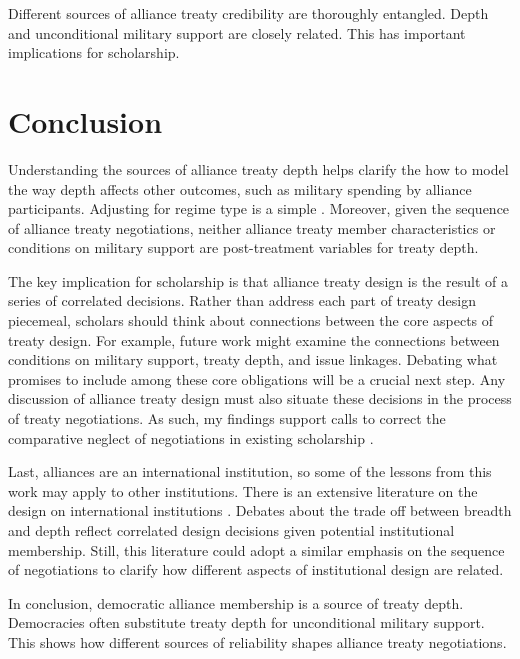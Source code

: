 \documentclass[12pt]{article}
\begin{document}
Different sources of alliance treaty credibility are thoroughly entangled. 
Depth and unconditional military support are closely related. 
This has important implications for scholarship. 


\section{Conclusion}


Understanding the sources of alliance treaty depth helps clarify the how to model the way depth affects other outcomes, such as military spending by alliance participants. 
Adjusting for regime type is a simple . 
Moreover, given the sequence of alliance treaty negotiations, neither alliance treaty member characteristics or conditions on military support are post-treatment variables for treaty depth. 


The key implication for scholarship is that alliance treaty design is the result of a series of correlated decisions. 
Rather than address each part of treaty design piecemeal, scholars should think about connections between the core aspects of treaty design. 
For example, future work might examine the connections between conditions on military support, treaty depth, and issue linkages.  
Debating what promises to include among these core obligations will be a crucial next step. 
Any discussion of alliance treaty design must also situate these decisions in the process of treaty negotiations.
As such, my findings support calls to correct the comparative neglect of negotiations in existing scholarship \citep{Poast2019a}. 


Last, alliances are an international institution, so some of the lessons from this work may apply to other institutions. 
There is an extensive literature on the design on international institutions \citep{DownesRocke1995, MartinSimmons1998, Koremenosetal2001, Koremenos2005, Thompson2010}.
Debates about the trade off between breadth and depth \citep{Downsetal1998, Gilligan2004} reflect correlated design decisions given potential institutional membership. 
Still, this literature could adopt a similar emphasis on the sequence of negotiations to clarify how different aspects of institutional design are related. 


In conclusion, democratic alliance membership is a source of treaty depth. 
Democracies often substitute treaty depth for unconditional military support. 
This shows how different sources of reliability shapes alliance treaty negotiations. 



\singlespace
 
 
\end{document}
